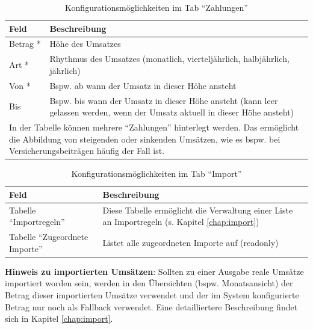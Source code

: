 \renewcommand{\arraystretch}{1.5}
\begin{table}[!ht]
\centering
\begin{tabular}{|p{6cm}|p{8cm}|}
\hline 
\textbf{Feld} & \textbf{Beschreibung} \\ 
\hline 
Betrag * & Höhe des Umsatzes \\ 
\hline 
Art * & Rhythmus des Umsatzes (monatlich, vierteljährlich, halbjährlich, jährlich) \\ 
\hline 
Von * & Bspw. ab wann der Umsatz in dieser Höhe ansteht \\ 
\hline 
Bis & Bspw. bis wann der Umsatz in dieser Höhe ansteht (kann leer gelassen werden, wenn der Umsatz aktuell in dieser Höhe ansteht) \\ 
\hline 
\multicolumn{2}{|p{14cm}|}{In der Tabelle können mehrere "`Zahlungen"' hinterlegt werden. Das ermöglicht die Abbildung von steigenden oder sinkenden Umsätzen, wie es bspw. bei Versicherungsbeiträgen häufig der Fall ist.} \\ 
\hline 
\end{tabular} 
\caption{Konfigurationsmöglichkeiten im Tab "`Zahlungen"'}
\end{table}
\renewcommand{\arraystretch}{1.0}

\renewcommand{\arraystretch}{1.5}
\begin{table}[!ht]
\centering
\begin{tabular}{|p{6cm}|p{8cm}|}
\hline 
\textbf{Feld} & \textbf{Beschreibung} \\ 
\hline 
Tabelle "`Importregeln"' & Diese Tabelle ermöglicht die Verwaltung einer Liste an Importregeln (s. Kapitel \ref{chap:import}) \\ 
\hline 
Tabelle "`Zugeordnete Importe"' & Listet alle zugeordneten Importe auf (readonly) \\ 
\hline 
\end{tabular} 
\caption{Konfigurationsmöglichkeiten im Tab "`Import"'}
\end{table}
\renewcommand{\arraystretch}{1.0}

\begin{infobox}
\textbf{Hinweis zu importierten Umsätzen}: Sollten zu einer Ausgabe reale Umsätze importiert worden sein, werden in den Übersichten (bspw. Monatsansicht) der Betrag dieser importierten Umsätze verwendet und der im System konfigurierte Betrag nur noch als Fallback verwendet. Eine detailliertere Beschreibung findet sich in Kapitel \ref{chap:import}. 
\end{infobox}

